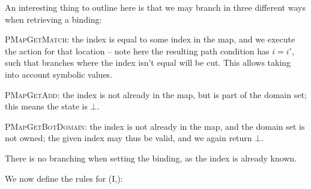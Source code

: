 An interesting thing to outline here is that we may branch in three different ways when retrieving a binding: \begin{compactitem}
\item \textsc{PMapGetMatch}: the index is equal to some index in the map, and we execute the action for that location -- note here the resulting path condition has $i=i'$, such that branches where the index isn't equal will be cut. This allows taking into account symbolic values.
\item \textsc{PMapGetAdd}: the index is not already in the map, but is part of the domain set; this means the state is $\bot$.
\item \textsc{PMapGetBotDomain}: the index is not already in the map, and the domain set is not owned; the given index may thus be valid, and we again return $\bot$.
 \end{compactitem}
 There is no branching when setting the binding, as the index is already known.

We now define the rules for \PMap(I,\mmdl):

